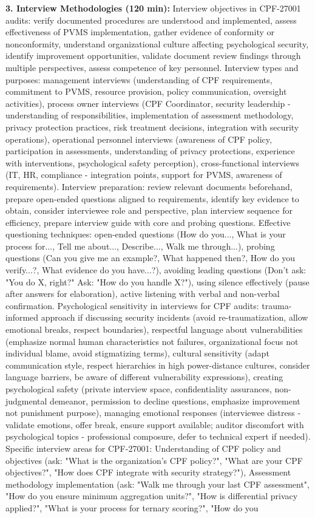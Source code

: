 \documentclass[11pt,a4paper]{article}
\begin{document}
\textbf{3. Interview Methodologies (120 min):} Interview objectives in CPF-27001 audits: verify documented procedures are understood and implemented, assess effectiveness of PVMS implementation, gather evidence of conformity or nonconformity, understand organizational culture affecting psychological security, identify improvement opportunities, validate document review findings through multiple perspectives, assess competence of key personnel. Interview types and purposes: management interviews (understanding of CPF requirements, commitment to PVMS, resource provision, policy communication, oversight activities), process owner interviews (CPF Coordinator, security leadership - understanding of responsibilities, implementation of assessment methodology, privacy protection practices, risk treatment decisions, integration with security operations), operational personnel interviews (awareness of CPF policy, participation in assessments, understanding of privacy protections, experience with interventions, psychological safety perception), cross-functional interviews (IT, HR, compliance - integration points, support for PVMS, awareness of requirements). Interview preparation: review relevant documents beforehand, prepare open-ended questions aligned to requirements, identify key evidence to obtain, consider interviewee role and perspective, plan interview sequence for efficiency, prepare interview guide with core and probing questions. Effective questioning techniques: open-ended questions (How do you..., What is your process for..., Tell me about..., Describe..., Walk me through...), probing questions (Can you give me an example?, What happened then?, How do you verify...?, What evidence do you have...?), avoiding leading questions (Don't ask: "You do X, right?" Ask: "How do you handle X?"), using silence effectively (pause after answers for elaboration), active listening with verbal and non-verbal confirmation. Psychological sensitivity in interviews for CPF audits: trauma-informed approach if discussing security incidents (avoid re-traumatization, allow emotional breaks, respect boundaries), respectful language about vulnerabilities (emphasize normal human characteristics not failures, organizational focus not individual blame, avoid stigmatizing terms), cultural sensitivity (adapt communication style, respect hierarchies in high power-distance cultures, consider language barriers, be aware of different vulnerability expressions), creating psychological safety (private interview space, confidentiality assurances, non-judgmental demeanor, permission to decline questions, emphasize improvement not punishment purpose), managing emotional responses (interviewee distress - validate emotions, offer break, ensure support available; auditor discomfort with psychological topics - professional composure, defer to technical expert if needed). Specific interview areas for CPF-27001: Understanding of CPF policy and objectives (ask: "What is the organization's CPF policy?", "What are your CPF objectives?", "How does CPF integrate with security strategy?"), Assessment methodology implementation (ask: "Walk me through your last CPF assessment", "How do you ensure minimum aggregation units?", "How is differential privacy applied?", "What is your process for ternary scoring?", "How do you 
\end{document}
